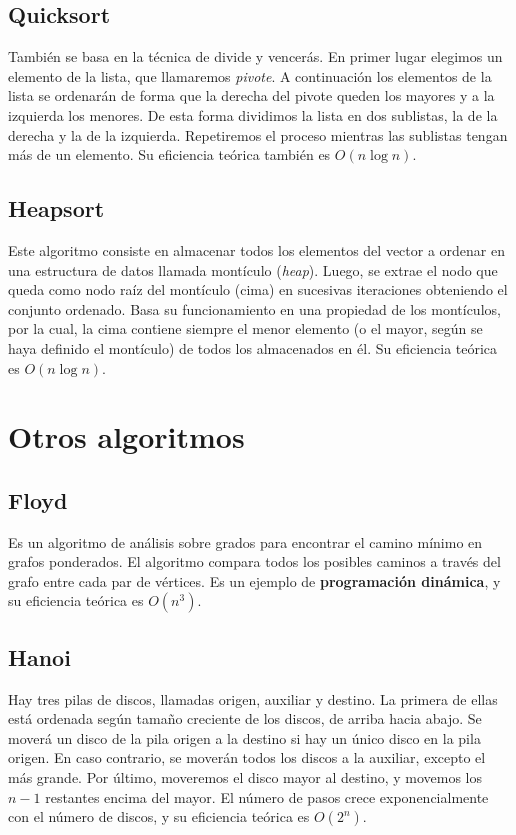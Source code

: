 \documentclass[11pt]{article}
\begin{document}
\subsection*{Quicksort}
También se basa en la técnica de divide y vencerás.
En primer lugar elegimos un elemento de la lista, que llamaremos \textit{pivote}. A continuación los elementos de la lista se ordenarán de forma que la derecha del pivote queden los mayores y a la izquierda los menores. De esta forma dividimos la lista en dos sublistas, la de la derecha y la de la izquierda. Repetiremos el proceso mientras las sublistas tengan más de un elemento. Su eficiencia teórica también es $O(n\log n)$.

\subsection*{Heapsort}
Este algoritmo consiste en almacenar todos los elementos del vector a ordenar en una estructura de datos llamada montículo (\textit{heap}). Luego, se extrae el nodo que queda como nodo raíz del montículo (cima) en sucesivas iteraciones obteniendo el conjunto ordenado. Basa su funcionamiento en una propiedad de los montículos, por la cual, la cima contiene siempre el menor elemento (o el mayor, según se haya definido el montículo) de todos los almacenados en él. Su eficiencia teórica es $O(n\log n)$.

\section*{Otros algoritmos}

\subsection*{Floyd}
Es un algoritmo de análisis sobre grados para encontrar el camino mínimo en grafos ponderados. El algoritmo compara todos los posibles caminos a través del grafo entre cada par de vértices. Es un ejemplo de \textbf{programación dinámica}, y su eficiencia teórica es $O(n^3)$.

\subsection*{Hanoi}
Hay tres pilas de discos, llamadas origen, auxiliar y destino. La primera de ellas está ordenada según tamaño creciente de los discos, de arriba hacia abajo. Se moverá un disco de la pila origen a la destino si hay un único disco en la pila origen. En caso contrario, se moverán todos los discos a la auxiliar, excepto el más grande. Por último, moveremos el disco mayor al destino, y movemos los $n-1$ restantes encima del mayor. El número de pasos crece exponencialmente con el número de discos, y su eficiencia teórica es $O(2^n)$.
\end{document}

